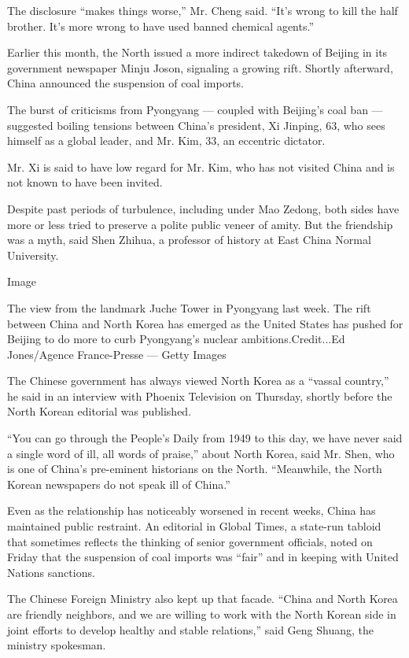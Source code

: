 The disclosure ``makes things worse,'' Mr. Cheng said. ``It's wrong to
kill the half brother. It's more wrong to have used banned chemical
agents.''

Earlier this month, the North issued a more indirect takedown of Beijing
in its government newspaper Minju Joson, signaling a growing rift.
Shortly afterward, China announced the suspension of coal imports.

The burst of criticisms from Pyongyang --- coupled with Beijing's coal
ban --- suggested boiling tensions between China's president, Xi
Jinping, 63, who sees himself as a global leader, and Mr. Kim, 33, an
eccentric dictator.

Mr. Xi is said to have low regard for Mr. Kim, who has not visited China
and is not known to have been invited.

Despite past periods of turbulence, including under Mao Zedong, both
sides have more or less tried to preserve a polite public veneer of
amity. But the friendship was a myth, said Shen Zhihua, a professor of
history at East China Normal University.

Image

The view from the landmark Juche Tower in Pyongyang last week. The rift
between China and North Korea has emerged as the United States has
pushed for Beijing to do more to curb Pyongyang's nuclear
ambitions.Credit...Ed Jones/Agence France-Presse --- Getty Images

The Chinese government has always viewed North Korea as a ``vassal
country,'' he said in an interview with Phoenix Television on Thursday,
shortly before the North Korean editorial was published.

``You can go through the People's Daily from 1949 to this day, we have
never said a single word of ill, all words of praise,'' about North
Korea, said Mr. Shen, who is one of China's pre-eminent historians on
the North. ``Meanwhile, the North Korean newspapers do not speak ill of
China.''

Even as the relationship has noticeably worsened in recent weeks, China
has maintained public restraint. An editorial in Global Times, a
state-run tabloid that sometimes reflects the thinking of senior
government officials, noted on Friday that the suspension of coal
imports was ``fair'' and in keeping with United Nations sanctions.

The Chinese Foreign Ministry also kept up that facade. ``China and North
Korea are friendly neighbors, and we are willing to work with the North
Korean side in joint efforts to develop healthy and stable relations,''
said Geng Shuang, the ministry spokesman.

